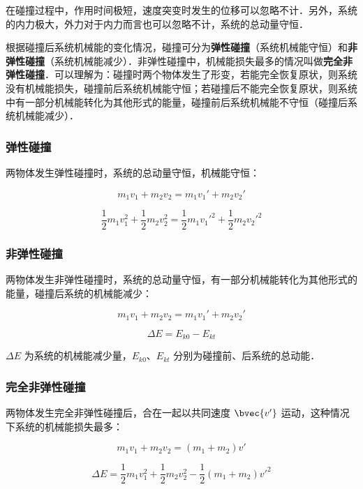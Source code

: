 在碰撞过程中，作用时间极短，速度突变时发生的位移可以忽略不计．另外，系统的内力极大，外力对于内力而言也可以忽略不计，系统的总动量守恒．

根据碰撞后系统机械能的变化情况，碰撞可分为\textbf{弹性碰撞}（系统机械能守恒）和\textbf{非弹性碰撞}（系统机械能减少）．非弹性碰撞中，机械能损失最多的情况叫做\textbf{完全非弹性碰撞}．可以理解为：碰撞时两个物体发生了形变，若能完全恢复原状，则系统没有机械能损失，碰撞前后系统机械能守恒；若碰撞后不能完全恢复原状，则系统中有一部分机械能转化为其他形式的能量，碰撞前后系统机械能不守恒（碰撞后系统机械能减少）．

\subsubsection{弹性碰撞}

两物体发生弹性碰撞时，系统的总动量守恒，机械能守恒：

\begin{equation}
m_1v_1+m_2v_2=m_1v_1'+m_2v_2'
\end{equation}

\begin{equation}
\frac12m_1v_1^2+\frac12m_2v_2^2=\frac12m_1v_1'^2+\frac12m_2v_2'^2
\end{equation}

\subsubsection{非弹性碰撞}

两物体发生非弹性碰撞时，系统的总动量守恒，有一部分机械能转化为其他形式的能量，碰撞后系统的机械能减少：

\begin{equation}
m_1v_1+m_2v_2=m_1v_1'+m_2v_2'
\end{equation}

\begin{equation}
\Delta E = E_{k0}-E_{kt}
\end{equation}

$\Delta E$ 为系统的机械能减少量，$E_{k0}$、$ E_{kt}$ 分别为碰撞前、后系统的总动能．

\subsubsection{完全非弹性碰撞}

两物体发生完全非弹性碰撞后，合在一起以共同速度 $\bvec {v'}$ 运动，这种情况下系统的机械能损失最多：

\begin{equation}
m_1v_1+m_2v_2=(m_1+m_2)v'
\end{equation}

\begin{equation}
\Delta E=\frac12m_1v_1^2+\frac12m_2v_2^2-\frac12(m_1+m_2)v'^2
\end{equation}

